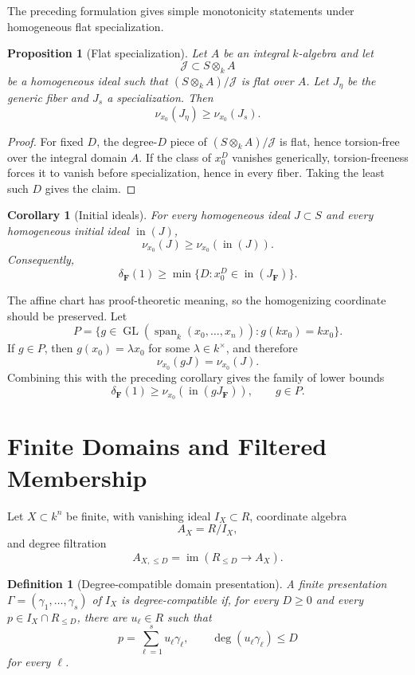 \documentclass[11pt]{article}
\newtheorem{proposition}[theorem]{Proposition}
\newtheorem{corollary}[theorem]{Corollary}
\newtheorem{definition}[theorem]{Definition}
\DeclareMathOperator{\im}{im}
\begin{document}
The preceding formulation gives simple monotonicity statements under homogeneous flat specialization.

\begin{proposition}[Flat specialization]
Let \(A\) be an integral \(k\)-algebra and let
\[
\mathcal J\subset S\otimes_k A
\]
be a homogeneous ideal such that \((S\otimes_k A)/\mathcal J\) is flat over \(A\). Let \(J_\eta\) be the generic fiber and \(J_s\) a specialization. Then
\[
\nu_{x_0}(J_\eta)\ge \nu_{x_0}(J_s).
\]
\end{proposition}

\begin{proof}
For fixed \(D\), the degree-\(D\) piece of \((S\otimes_k A)/\mathcal J\) is flat, hence torsion-free over the integral domain \(A\). If the class of \(x_0^D\) vanishes generically, torsion-freeness forces it to vanish before specialization, hence in every fiber. Taking the least such \(D\) gives the claim.
\end{proof}

\begin{corollary}[Initial ideals]
For every homogeneous ideal \(J\subset S\) and every homogeneous initial ideal \(\operatorname{in}(J)\),
\[
\nu_{x_0}(J)\ge \nu_{x_0}(\operatorname{in}(J)).
\]
Consequently,
\[
\delta_{\mathbf F}(1)
\ge
\min\{D:x_0^D\in \operatorname{in}(J_{\mathbf F})\}.
\]
\end{corollary}

The affine chart has proof-theoretic meaning, so the homogenizing coordinate should be preserved. Let
\[
P=\{g\in \operatorname{GL}(\operatorname{span}_k(x_0,\ldots,x_n)):g(kx_0)=kx_0\}.
\]
If \(g\in P\), then \(g(x_0)=\lambda x_0\) for some \(\lambda\in k^\times\), and therefore
\[
\nu_{x_0}(gJ)=\nu_{x_0}(J).
\]
Combining this with the preceding corollary gives the family of lower bounds
\[
\delta_{\mathbf F}(1)\ge \nu_{x_0}(\operatorname{in}(gJ_{\mathbf F})),\qquad g\in P.
\]

\section{Finite Domains and Filtered Membership}

Let \(X\subset k^n\) be finite, with vanishing ideal \(I_X\subset R\), coordinate algebra
\[
A_X=R/I_X,
\]
and degree filtration
\[
A_{X,\le D}=\im(R_{\le D}\to A_X).
\]

\begin{definition}[Degree-compatible domain presentation]
A finite presentation \(\Gamma=(\gamma_1,\ldots,\gamma_s)\) of \(I_X\) is degree-compatible if, for every \(D\ge0\) and every \(p\in I_X\cap R_{\le D}\), there are \(u_\ell\in R\) such that
\[
p=\sum_{\ell=1}^s u_\ell\gamma_\ell,\qquad
\deg(u_\ell\gamma_\ell)\le D
\]
for every \(\ell\).
\end{definition}
\end{document}
